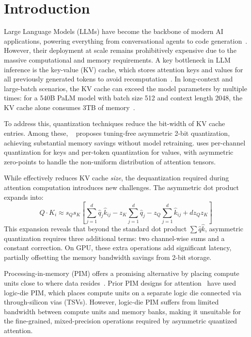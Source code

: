 \section{Introduction}

Large Language Models (LLMs) have become the backbone of modern AI applications, powering everything from conversational agents to code generation~\citep{gpt3,brown2020language}.
However, their deployment at scale remains prohibitively expensive due to the massive computational and memory requirements.
A key bottleneck in LLM inference is the key-value (KV) cache, which stores attention keys and values for all previously generated tokens to avoid recomputation~\citep{pope2023efficiently}.
In long-context and large-batch scenarios, the KV cache can exceed the model parameters by multiple times: for a 540B PaLM model with batch size 512 and context length 2048, the KV cache alone consumes 3TB of memory~\citep{pope2023efficiently}.

To address this, quantization techniques reduce the bit-width of KV cache entries.
Among these, \kivi{}~\citep{kivi} proposes tuning-free asymmetric 2-bit quantization, achieving substantial memory savings without model retraining.
\kivi{} uses per-channel quantization for keys and per-token quantization for values, with asymmetric zero-points to handle the non-uniform distribution of attention tensors.

While \kivi{} effectively reduces KV cache \emph{size}, the dequantization required during attention computation introduces new challenges.
The asymmetric dot product expands into:
\begin{equation}
Q \cdot K_i \approx s_Q s_K \left[\sum_{j=1}^{d} \hat{q}_j \hat{k}_{ij} - z_K\sum_{j=1}^{d} \hat{q}_j - z_Q\sum_{j=1}^{d} \hat{k}_{ij} + d z_Q z_K\right]
\label{eq:asym_dot}
\end{equation}
This expansion reveals that beyond the standard dot product $\sum \hat{q}\hat{k}$, asymmetric quantization requires three additional terms: two channel-wise sums and a constant correction.
On GPU, these extra operations add significant latency, partially offsetting the memory bandwidth savings from 2-bit storage.

Processing-in-memory (PIM) offers a promising alternative by placing compute units close to where data resides~\citep{mutlu2020processing}.
Prior PIM designs for attention~\citep{duplex} have used logic-die PIM, which places compute units on a separate logic die connected via through-silicon vias (TSVs).
However, logic-die PIM suffers from limited bandwidth between compute units and memory banks, making it unsuitable for the fine-grained, mixed-precision operations required by asymmetric quantized attention.

